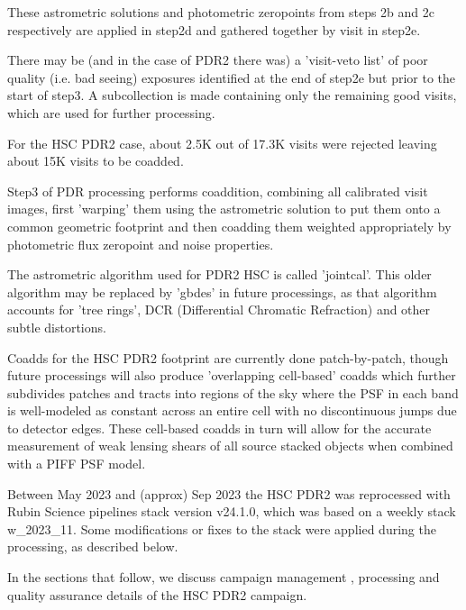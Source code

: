 These astrometric solutions and photometric zeropoints from steps 2b and 2c
respectively are applied in step2d and gathered together by visit in step2e.

There may be (and in the case of PDR2 there was) a 'visit-veto list' of 
poor quality (i.e. bad seeing) exposures identified at the end of step2e but 
prior to the start of step3.  A subcollection is made containing only 
the remaining good visits, which are used for further processing.  

For the HSC PDR2 case, about 2.5K out of 17.3K visits were rejected 
leaving about 15K visits to be coadded.

Step3 of PDR processing performs coaddition, combining all calibrated 
visit images, first 'warping' them using the astrometric solution to put 
them onto a common geometric footprint and then coadding them weighted 
appropriately by photometric flux zeropoint and noise properties.

The astrometric algorithm used for PDR2 HSC is called 'jointcal'.  This
older algorithm may be replaced by 'gbdes' in future processings, as that
algorithm accounts for 'tree rings', DCR 
(Differential Chromatic Refraction) and other subtle distortions.

Coadds for the HSC PDR2 footprint are currently done patch-by-patch,
though future processings will also produce 'overlapping cell-based' 
coadds which further subdivides patches and tracts into regions of 
the sky where the PSF in each band is well-modeled as constant 
across an entire cell with no discontinuous jumps due to detector edges.
These cell-based coadds in turn will allow for the accurate measurement of 
weak lensing shears of all source stacked objects when combined with
a PIFF PSF model.

Between May 2023 and (approx) Sep 2023 the HSC PDR2 was reprocessed with 
Rubin Science pipelines stack version v24.1.0, which was 
based on a weekly stack w\_2023\_11.  Some modifications or fixes 
to the stack were applied during the processing, as described below.

In the sections that follow, we discuss campaign 
management , 
processing  and quality 
assurance  details of the HSC PDR2 campaign.


